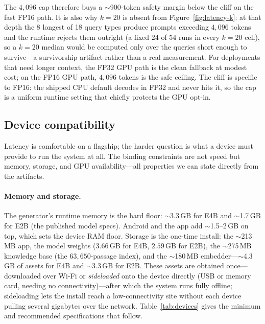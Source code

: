 The $4{,}096$ cap therefore buys a $\sim$900-token safety margin below the
cliff on the fast FP16 path. It is also why $k=20$ is absent from
Figure~\ref{fig:latency-k}: at that depth the 8 longest of 18 query types
produce prompts exceeding $4{,}096$ tokens and the runtime rejects them outright
(a fixed 24 of 54 runs in every $k=20$ cell), so a $k=20$ median would be
computed only over the queries short enough to survive---a survivorship
artifact rather than a real measurement. For deployments that need longer
context, the FP32 GPU path is the clean fallback at modest cost; on the FP16 GPU
path, $4{,}096$ tokens is the safe ceiling. The cliff is specific to FP16: the
shipped CPU default decodes in FP32 and never hits it, so the cap is a uniform
runtime setting that chiefly protects the GPU opt-in.

\subsection{Device compatibility}
\label{sec:devices}

Latency is comfortable on a flagship; the harder question is what a device must
provide to run the system at all. The binding constraints are not speed but
memory, storage, and GPU availability---all properties we can state directly
from the artifacts.

\paragraph{Memory and storage.} The generator's runtime memory is the hard
floor: $\sim$3.3\,GB for E4B and $\sim$1.7\,GB for E2B (the published model
specs). Android and the app add $\sim$1.5--2\,GB on top, which sets the device
RAM floor. Storage is the one-time install: the $\sim$213\,MB app, the model
weights ($3.66$\,GB for E4B, $2.59$\,GB for E2B), the $\sim$275\,MB
knowledge base (the $63{,}650$-passage index), and the $\sim$180\,MB
embedder---$\sim$4.3\,GB of assets for E4B and $\sim$3.3\,GB for E2B. These assets are obtained
once---downloaded over Wi-Fi or \emph{sideloaded} onto the device directly (USB
or memory card, needing no connectivity)---after which the system runs fully
offline; sideloading lets the install reach a low-connectivity site without
each device pulling several gigabytes over the network. Table~\ref{tab:devices}
gives the minimum and recommended specifications that follow.

